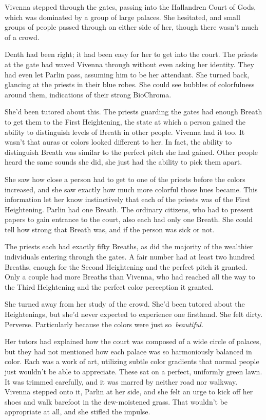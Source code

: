 \orn

Vivenna stepped through the gates, passing into the Hallandren Court of Gods, which was dominated by a group of large palaces. She hesitated, and small groups of people passed through on either side of her, though there wasn’t much of a crowd.

Denth had been right; it had been easy for her to get into the court. The priests at the gate had waved Vivenna through without even asking her identity. They had even let Parlin pass, assuming him to be her attendant. She turned back, glancing at the priests in their blue robes. She could see bubbles of colorfulness around them, indications of their strong BioChroma.

She’d been tutored about this. The priests guarding the gates had enough Breath to get them to the First Heightening, the state at which a person gained the ability to distinguish levels of Breath in other people. Vivenna had it too. It wasn’t that auras or colors looked different to her. In fact, the ability to distinguish Breath was similar to the perfect pitch she had gained. Other people heard the same sounds she did, she just had the ability to pick them apart.

She saw how close a person had to get to one of the priests before the colors increased, and she saw exactly how much more colorful those hues became. This information let her know instinctively that each of the priests was of the First Heightening. Parlin had one Breath. The ordinary citizens, who had to present papers to gain entrance to the court, also each had only one Breath. She could tell how strong that Breath was, and if the person was sick or not.

The priests each had exactly fifty Breaths, as did the majority of the wealthier individuals entering through the gates. A fair number had at least two hundred Breaths, enough for the Second Heightening and the perfect pitch it granted. Only a couple had more Breaths than Vivenna, who had reached all the way to the Third Heightening and the perfect color perception it granted.

She turned away from her study of the crowd. She’d been tutored about the Heightenings, but she’d never expected to experience one firsthand. She felt dirty. Perverse. Particularly because the colors were just so~\textit{beautiful.}

Her tutors had explained how the court was composed of a wide circle of palaces, but they had not mentioned how each palace was so harmoniously balanced in color. Each was a work of art, utilizing subtle color gradients that normal people just wouldn’t be able to appreciate. These sat on a perfect, uniformly green lawn. It was trimmed carefully, and it was marred by neither road nor walkway. Vivenna stepped onto it, Parlin at her side, and she felt an urge to kick off her shoes and walk barefoot in the dew-moistened grass. That wouldn’t be appropriate at all, and she stifled the impulse.

